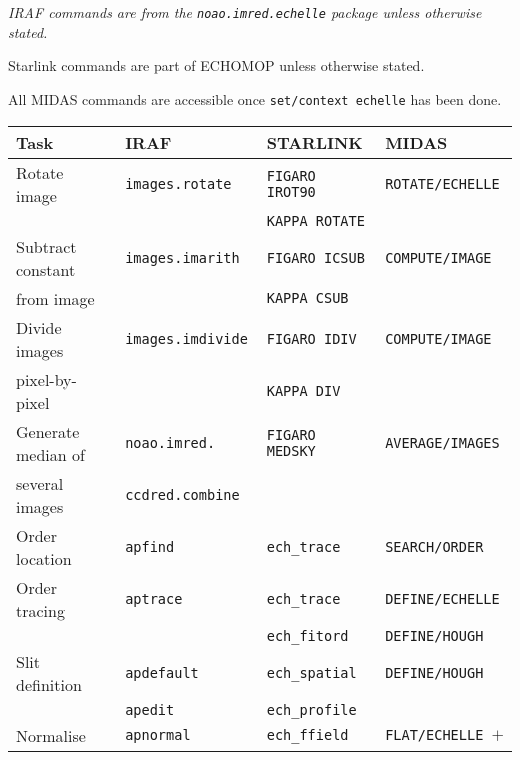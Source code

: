 \begin{latex}
\begin{table}
\begin{center}
{\sl
IRAF commands are from the {\tt noao.imred.echelle} package unless otherwise
stated.

Starlink commands are part of ECHOMOP unless otherwise stated.

All MIDAS commands are accessible once {\tt set/context echelle} has been done.
}
\vspace*{11pt}

\begin{tabular}{llll}
\hline\hline
{\bf Task}         & IRAF                   & STARLINK             & MIDAS                     \\
\hline\hline
Rotate image       & {\tt images.rotate   } & {\tt FIGARO IROT90 } & {\tt ROTATE/ECHELLE     } \\
                   &                        & {\tt KAPPA ROTATE  } &                           \\
Subtract constant  & {\tt images.imarith  } & {\tt FIGARO ICSUB  } & {\tt COMPUTE/IMAGE      } \\
from image         &                        & {\tt KAPPA CSUB    } &                           \\
Divide images      & {\tt images.imdivide } & {\tt FIGARO IDIV   } & {\tt COMPUTE/IMAGE      } \\
pixel-by-pixel     &                        & {\tt KAPPA DIV     } &                           \\
Generate median of & {\tt noao.imred.     } & {\tt FIGARO MEDSKY } & {\tt AVERAGE/IMAGES     } \\
several images     & {\tt ccdred.combine  } &                      &                           \\
Order location     & {\tt apfind          } & {\tt ech\_trace    } & {\tt SEARCH/ORDER       } \\
Order tracing      & {\tt aptrace         } & {\tt ech\_trace    } & {\tt DEFINE/ECHELLE     } \\
                   &                        & {\tt ech\_fitord   } & {\tt DEFINE/HOUGH       } \\
Slit definition    & {\tt apdefault       } & {\tt ech\_spatial  } & {\tt DEFINE/HOUGH       } \\
                   & {\tt apedit          } & {\tt ech\_profile  } &                           \\
Normalise          & {\tt apnormal        } & {\tt ech\_ffield   } & {\tt FLAT/ECHELLE $+$   } \\

\end{tabular}
\end{center}
\end{table}
\end{latex}
